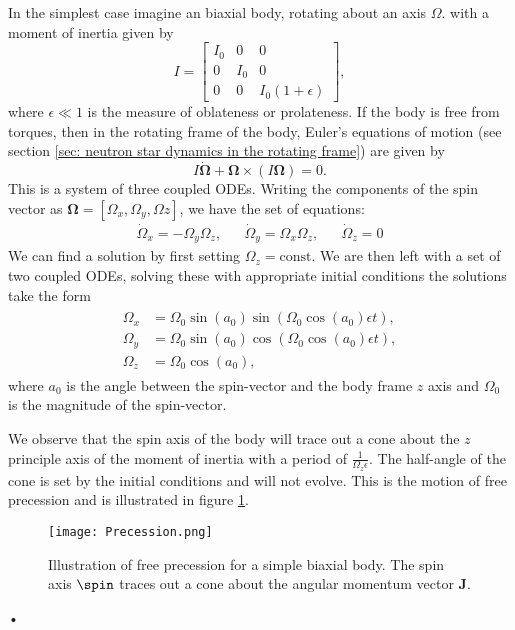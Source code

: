 In the simplest case imagine an biaxial body,
rotating about an axis $\Omega$. with a moment of inertia given by
\begin{equation}
    I = \left[\begin{array}{ccc}
            I_{0} & 0 & 0 \\
            0 & I_{0} & 0 \\
            0 & 0 & I_{0}(1 + \epsilon)
            \end{array}\right],
\end{equation}
where $\epsilon \ll 1$ is the measure of oblateness or prolateness.  If the
body is free from torques, then in the rotating frame of the body, Euler's
equations of motion (see section \ref{sec: neutron star dynamics in the
rotating frame}) are given by
\begin{equation}
    I\dot{\bm{\Omega}} + \bm{\Omega} \times \left(I\bm{\Omega}\right)=0.
\end{equation}
This is a system of three coupled ODEs. Writing the components of the spin
vector as $\bm{\Omega} = [\Omega_{x}, \Omega_{y}, \Omega{z}]$, we have the
set of equations:
\begin{align}
\dot{\Omega}_x = -\Omega_y\Omega_z, &&
\dot{\Omega}_y = \Omega_x \Omega_z, &&
\dot{\Omega}_z = 0
\end{align}
We can find a solution by first setting $\Omega_{z}=\mathrm{const}$.
We are then left with a set of
two coupled ODEs, solving these with appropriate initial conditions
the solutions take the form
\begin{align}
\begin{split}
    \Omega_{x} & = \Omega_{0}\sin(a_0)\sin\left(\Omega_{0}\cos(a_0)\epsilon t\right), \\
    \Omega_{y} & = \Omega_{0}\sin(a_0)\cos\left(\Omega_{0}\cos(a_0)\epsilon t\right),\\
    \Omega_{z} & = \Omega_0 \cos(a_0),
\end{split}
\end{align}
where $a_0$ is the angle between the spin-vector and the body frame $z$ axis and
$\Omega_0$ is the magnitude of the spin-vector.

We observe that the spin axis of the body will trace out a cone about the $z$
principle axis of the moment of inertia with a period of
$\frac{1}{\Omega_{z}\epsilon}$.  The half-angle of the cone is set by the
initial conditions and will not evolve. This is the motion of free precession
and is illustrated in figure \ref{fig: precession}.
\begin{figure}[htb]
\centering
\texttt{[image: Precession.png]}
\caption{Illustration of free precession for a simple biaxial body. The spin
    axis $\spin$ traces out a cone about the angular momentum vector $\mathbf{J}$.}
\label{fig: precession}
\end{figure}•

